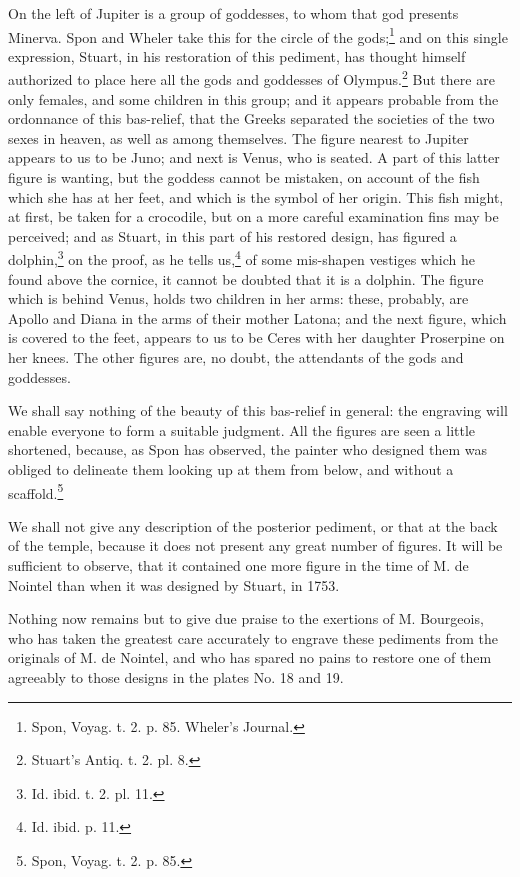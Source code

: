 \documentclass[a4paper, 11pt, oneside, polutonikogreek, english]{article}
\begin{document}
On the left of Jupiter is a group of goddesses, to whom that god presents Minerva. Spon and Wheler take this for the circle of the gods;\footnote{Spon, Voyag. t. 2. p. 85. Wheler's Journal.} and on this single expression, Stuart, in his restoration of this pediment, has thought himself authorized to place here all the gods and goddesses of Olympus.\footnote{Stuart's Antiq. t. 2. pl. 8.} But there are only females, and some children in this group; and it appears probable from the ordonnance of this bas-relief, that the Greeks separated the societies of the two sexes in heaven, as well as among themselves. The figure nearest to Jupiter appears to us to be Juno; and next is Venus, who is seated. A part of this latter figure is wanting, but the goddess cannot be mistaken, on account of the fish which she has at her feet, and which is the symbol of her origin. This fish might, at first, be taken for a crocodile, but on a more careful examination fins may be perceived; and as Stuart, in this part of his restored design, has figured a dolphin,\footnote{Id. ibid. t. 2. pl. 11.} on the proof, as he tells us,\footnote{Id. ibid. p. 11.} of some mis-shapen vestiges which he found above the cornice, it cannot be doubted that it is a dolphin. The figure which is behind Venus, holds two children in her arms: these, probably, are Apollo and Diana in the arms of their mother Latona; and the next figure, which is covered to the feet, appears to us to be Ceres with her daughter Proserpine on her knees. The other figures are, no doubt, the attendants of the gods and goddesses.

We shall say nothing of the beauty of this bas-relief in general: the engraving will enable everyone to form a suitable judgment. All the figures are seen a little shortened, because, as Spon has observed, the painter who designed them was obliged to delineate them looking up at them from below, and without a scaffold.\footnote{Spon, Voyag. t. 2. p. 85.}

We shall not give any description of the posterior pediment, or that at the back of the temple, because it does not present any great number of figures. It will be sufficient to observe, that it contained one more figure in the time of M. de Nointel than when it was designed by Stuart, in 1753.

Nothing now remains but to give due praise to the exertions of M. Bourgeois, who has taken the greatest care accurately to engrave these pediments from the originals of M. de Nointel, and who has spared no pains to restore one of them agreeably to those designs in the plates No. 18 and 19.
\end{document}
